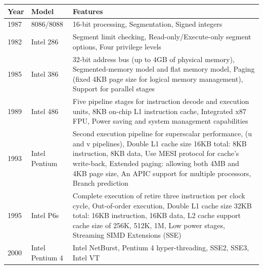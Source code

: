 \documentclass[letterpaper,10pt,titlepage]{article}
\begin{document}
\begin{center}
   \begin{longtable}{l l p{10cm}}
      \textbf{Year} & \textbf{Model}      & \textbf{Features}\\ \hline

      1987 & 8086/8088  & 16-bit processing, Segmentation, Signed integers \\ 
      \hline
      1982 & Intel 286  & Segment limit checking, Read-only/Execute-only 
      			  segment options, Four privilege levels \\
      \hline
      1985 & Intel 386  & 32-bit address bus (up to 4GB of physical memory),
      			  \newline
      			  Segmented-memory model and flat memory model,
			  \newline
			  Paging (fixed 4KB page size for logical
			  memory management), 
			  \newline
			  Support for parallel stages \\
      \hline
      1989 & Intel 486  & Five pipeline stages for instruction decode and
      			  execution units, 
			  \newline
			  8KB on-chip L1 instruction cache, 
			  \newline
			  Integrated x87 FPU,
		          \newline
			  Power saving and system management capabilities\\
      \hline
      1993 & Intel Pentium & Second execution pipeline for superscalar performance,
      			  \newline
      			  (u and v pipelines),
			  \newline
			  Double L1 cache size 16KB total: 8KB instruction, 
			  8KB data,
			  \newline
			  Use MESI protocol for cache's write-back,
			  \newline
			  Extended paging: allowing both 4MB and 4KB page size,
			  \newline
			  An APIC support for multiple processors,
			  \newline
			  Branch prediction\\
     \hline
     1995\newline-1999 & Intel P6s & Complete execution of retire three instruction 
     			  per clock cycle, 
			  \newline
			  Out-of-order execution,
			  \newline
			  Double L1 cache size 32KB total: 16KB instruction, 
			  16KB data,
			  \newline
			  L2 cache support cache size of 256K, 512K, 1M,
			  \newline
			  Low power stages,
			  Streaming SIMD Extensions (SSE)\\
     \hline
     2000\newline-2006 & Intel Pentium 4 & Intel NetBurst,
			  Pentium 4 hyper-threading,
			  SSE2, SSE3, Intel VT \\
     \hline
   \end{longtable}
\end{center}
\end{document}
